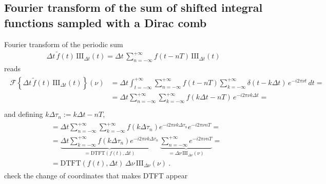\documentclass[letterpaper,10pt,english]{jupyterBook}
\begin{document}
\subsection{Fourier transform of the sum of shifted integral functions sampled with a Dirac comb}
\label{\detokenize{ch/complex/fourier-transforms:fourier-transform-of-the-sum-of-shifted-integral-functions-sampled-with-a-dirac-comb}}\label{\detokenize{ch/complex/fourier-transforms:complex-fourier-dft}}
\sphinxAtStartPar
Fourier transform of the periodic sum
\begin{equation*}
\begin{split}\Delta t \, \tilde{f}(t) \, \text{III}_{\Delta t}(t) = \Delta t \, \sum_{n=-\infty}^{+\infty} f(t-nT) \, \text{III}_{\Delta t}(t) \end{split}
\end{equation*}
\sphinxAtStartPar
reads
\begin{equation*}
\begin{split}\begin{aligned}
\mathscr{F}\left\{ \Delta t \, \tilde{f}(t) \, \text{III}_{\Delta t}(t) \right\}(\nu) 
  & = \Delta t \int_{t=-\infty}^{+\infty} \sum_{n=-\infty}^{+\infty} f(t-nT) \sum_{k=-\infty}^{+\infty} \delta(t-k \Delta t) \, e^{-i 2 \pi \nu t } \, dt = \\
  & = \Delta t \sum_{n=-\infty}^{+\infty} \sum_{k=-\infty}^{+\infty} f(k \Delta t - nT) \, e^{-i 2 \pi \nu k \Delta t } = \\
\end{aligned}\end{split}
\end{equation*}
\sphinxAtStartPar
and defining \(k \Delta \tau_n := k \Delta t - nT\),
\begin{equation*}
\begin{split}\begin{aligned}
& = \Delta t \sum_{n=-\infty}^{+\infty} \sum_{k=-\infty}^{+\infty} f(k \Delta \tau_n) e^{-i 2 \pi \nu k \Delta \tau_n} e^{-i 2 \pi \nu n T} = \\
& = \underbrace{\Delta t \sum_{k=-\infty}^{+\infty} f(k \Delta \tau_n) e^{-i 2 \pi \nu k \Delta \tau_n}}_{=\text{DTFT}(f(t), \Delta t)} \, \underbrace{\sum_{n=-\infty}^{+\infty} e^{-i 2 \pi \nu n T}}_{= \Delta \nu \, \text{III}_{\Delta \nu}(\nu)} = \\
& = \text{DTFT}(f(t), \Delta t) \, \Delta \nu \, \text{III}_{\Delta \nu}(\nu) \ .
\end{aligned}\end{split}
\end{equation*}
\sphinxAtStartPar
   check the change of coordinates that makes DTFT appear
\end{document}

